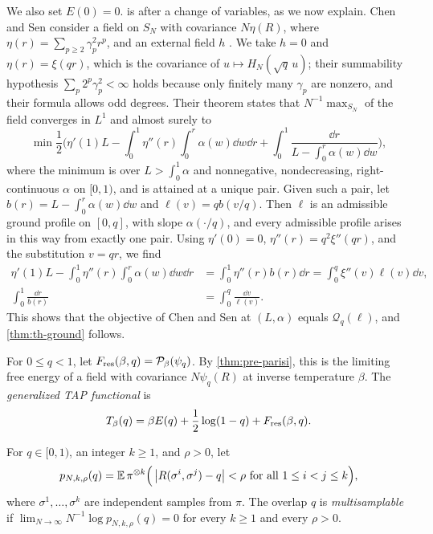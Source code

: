 We also set $E(0)=0$.  is \cite[Theorem~1]{ChenSen2017} after a change of variables, as we now explain. Chen and Sen consider a field on $S_N$ with covariance $N\eta(R)$, where $\eta(r)=\sum_{p\ge2}\gamma_p^2r^p$, and an external field $h$ \cite[(1)]{ChenSen2017}. We take $h=0$ and $\eta(r)=\xi(qr)$, which is the covariance of $u\mapsto H_N(\sqrt q\,u)$; their summability hypothesis $\sum_p2^p\gamma_p^2<\infty$ holds because only finitely many $\gamma_p$ are nonzero, and their formula allows odd degrees. Their theorem \cite[(8)--(11)]{ChenSen2017} states that $N^{-1}\max_{S_N}$ of the field converges in $L^1$ and almost surely to
\[
\min\frac12\bigg(\eta'(1)L-\int_0^1\eta''(r)\int_0^r\alpha(w)\dd w\dd r+\int_0^1\frac{\dd r}{L-\int_0^r\alpha(w)\dd w}\bigg),
\]
where the minimum is over $L>\int_0^1\alpha$ and nonnegative, nondecreasing, right-continuous $\alpha$ on $[0,1)$, and is attained at a unique pair. Given such a pair, let $b(r)=L-\int_0^r\alpha(w)\dd w$ and $\ell(v)=qb(v/q)$. Then $\ell$ is an admissible ground profile on $[0,q]$, with slope $\alpha(\cdot/q)$, and every admissible profile arises in this way from exactly one pair. Using $\eta'(0)=0$, $\eta''(r)=q^2\xi''(qr)$, and the substitution $v=qr$, we find
\[
\begin{aligned}
\eta'(1)L-\int_0^1\eta''(r)\int_0^r\alpha(w)\dd w\dd r&=\int_0^1\eta''(r)b(r)\dd r=\int_0^q\xi''(v)\ell(v)\dd v,\\
\int_0^1\frac{\dd r}{b(r)}&=\int_0^q\frac{\dd v}{\ell(v)}.
\end{aligned}
\]
This shows that the objective of Chen and Sen at $(L,\alpha)$ equals $\mathcal Q_q(\ell)$, and \cref{thm:th-ground} follows.

\begin{definition}\label{def:th-TAP}
For $0\le q<1$, let $F_{\rm res}(\beta,q)=\mathcal P_\beta(\psi_q)$. By \cref{thm:pre-parisi}, this is the limiting free energy of a field with covariance $N\psi_q(R)$ at inverse temperature $\beta$. The \emph{generalized TAP functional} is
\begin{equation}\label{eq:th-T}
T_\beta(q)=\beta E(q)+\frac12\log(1-q)+F_{\rm res}(\beta,q).
\end{equation}
\end{definition}

\begin{definition}\label{def:th-multisamplable}
For $q\in[0,1)$, an integer $k\ge1$, and $\rho>0$, let
\begin{equation}\label{eq:th-p}
p_{N,k,\rho}(q)=\mathbb E\,\pi^{\otimes k}\Big(\left|R(\sigma^i,\sigma^j)-q\right|<\rho\text{ for all }1\le i<j\le k\Big),
\end{equation}
where $\sigma^1,\dots,\sigma^k$ are independent samples from $\pi$. The overlap $q$ is \emph{multisamplable} if $\lim_{N\to\infty}N^{-1}\log p_{N,k,\rho}(q)=0$ for every $k\ge1$ and every $\rho>0$.
\end{definition}

